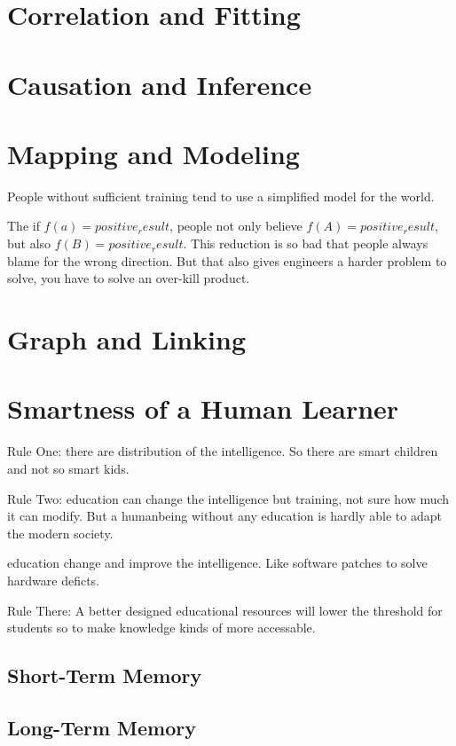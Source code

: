 \section{Correlation and Fitting}

\section{Causation and Inference}

\section{Mapping and Modeling}

People without sufficient training tend to use a simplified model for the world.

The if $f(a) = positive_result$, people not only believe $f(A) = positive_result$, but also $f(B) = positive_result$. This reduction is so bad that people always blame for the wrong direction. But that also gives engineers a harder problem to solve, you have to solve an over-kill product.


\section{Graph and Linking}

\section{Smartness of a Human Learner}

Rule One: there are distribution of the intelligence. So there are smart children and not so smart kids.

Rule Two: education can change the intelligence but training, not sure how much it can modify. But a humanbeing without any education is hardly able to adapt the modern society.

education change and improve the intelligence. Like software patches to solve hardware deficts.

Rule There: A better designed educational resources will lower the threshold for students so to make knowledge kinds of more accessable.

\subsection{Short-Term Memory}

\subsection{Long-Term Memory}

